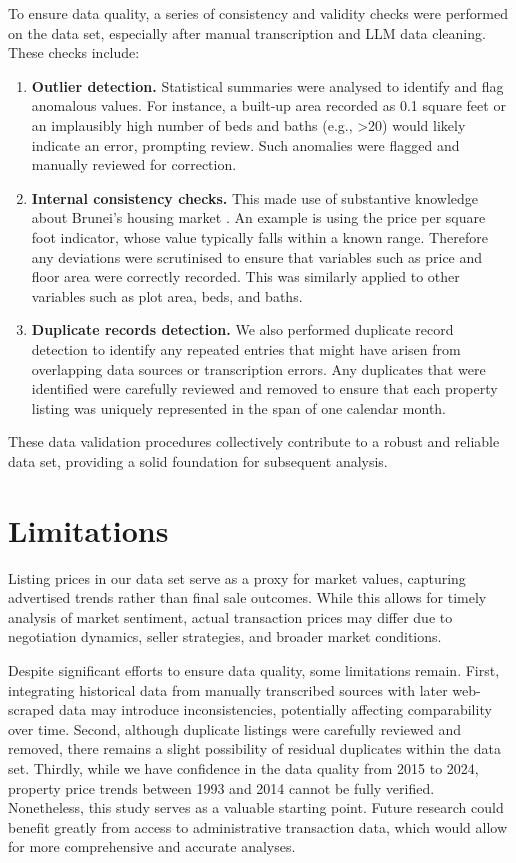 \documentclass[
  number]{elsarticle}
\providecommand{\tightlist}{%
  \setlength{\itemsep}{0pt}\setlength{\parskip}{0pt}}\usepackage{longtable,booktabs,array}
\begin{document}
To ensure data quality, a series of consistency and validity checks were
performed on the data set, especially after manual transcription and LLM
data cleaning. These checks include:

\begin{enumerate}
\def\labelenumi{\arabic{enumi}.}
\tightlist
\item
  \textbf{Outlier detection.} Statistical summaries were analysed to
  identify and flag anomalous values. For instance, a built-up area
  recorded as 0.1 square feet or an implausibly high number of beds and
  baths (e.g., \textgreater20) would likely indicate an error, prompting
  review. Such anomalies were flagged and manually reviewed for
  correction.
\item
  \textbf{Internal consistency checks.} This made use of substantive
  knowledge about Brunei's housing market
  \citep{jamil2025spatiotemporal}. An example is using the price per
  square foot indicator, whose value typically falls within a known
  range. Therefore any deviations were scrutinised to ensure that
  variables such as price and floor area were correctly recorded. This
  was similarly applied to other variables such as plot area, beds, and
  baths.
\item
  \textbf{Duplicate records detection.} We also performed duplicate
  record detection to identify any repeated entries that might have
  arisen from overlapping data sources or transcription errors. Any
  duplicates that were identified were carefully reviewed and removed to
  ensure that each property listing was uniquely represented in the span
  of one calendar month.
\end{enumerate}

These data validation procedures collectively contribute to a robust and
reliable data set, providing a solid foundation for subsequent analysis.

\section*{Limitations}\label{limitations}

Listing prices in our data set serve as a proxy for market values,
capturing advertised trends rather than final sale outcomes. While this
allows for timely analysis of market sentiment, actual transaction
prices may differ due to negotiation dynamics, seller strategies, and
broader market conditions.

Despite significant efforts to ensure data quality, some limitations
remain. First, integrating historical data from manually transcribed
sources with later web-scraped data may introduce inconsistencies,
potentially affecting comparability over time. Second, although
duplicate listings were carefully reviewed and removed, there remains a
slight possibility of residual duplicates within the data set. Thirdly,
while we have confidence in the data quality from 2015 to 2024, property
price trends between 1993 and 2014 cannot be fully verified.
Nonetheless, this study serves as a valuable starting point. Future
research could benefit greatly from access to administrative transaction
data, which would allow for more comprehensive and accurate analyses.
\end{document}

